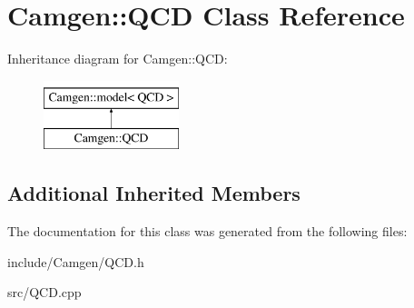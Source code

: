 \hypertarget{a00460}{}\section{Camgen\+:\+:Q\+C\+D Class Reference}
\label{a00460}
Inheritance diagram for Camgen\+:\+:Q\+C\+D\+:\begin{figure}[H]
\begin{center}
\leavevmode
\includegraphics[height=2.000000cm]{a00460}
\end{center}
\end{figure}
\subsection*{Additional Inherited Members}


The documentation for this class was generated from the following files\+:\begin{DoxyCompactItemize}
\item 
include/\+Camgen/Q\+C\+D.\+h\item 
src/Q\+C\+D.\+cpp\end{DoxyCompactItemize}

